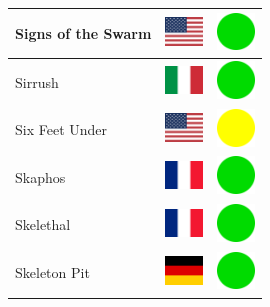 \documentclass[12pt, a4paper, twoside]{report}
\begin{document}
\begin{center}
\begin{longtable}{|p{5cm}|p{2cm}|p{2cm}|}
 Signs of the Swarm                                         & \includegraphics[width=1cm]{4x3/us} &   \includegraphics[width=1cm]{likes/y} \\ \hline
 Sirrush                                                    & \includegraphics[width=1cm]{4x3/it} &   \includegraphics[width=1cm]{likes/y} \\ \hline
 Six Feet Under                                             & \includegraphics[width=1cm]{4x3/us} &   \includegraphics[width=1cm]{likes/m} \\ \hline
 Skaphos                                                    & \includegraphics[width=1cm]{4x3/fr} &   \includegraphics[width=1cm]{likes/y} \\ \hline
 Skelethal                                                  & \includegraphics[width=1cm]{4x3/fr} &   \includegraphics[width=1cm]{likes/y} \\ \hline
 Skeleton Pit                                               & \includegraphics[width=1cm]{4x3/de} &   \includegraphics[width=1cm]{likes/y} \\ \hline

\end{longtable}
\end{center}
\end{document}
